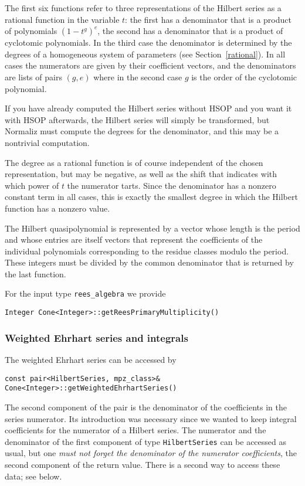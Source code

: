 \begin{small}
The first six functions refer to three representations of the Hilbert series as a rational function in the variable $t$: the first has a denominator that is a product of polynomials $(1-t^g)^e$, the second has a denominator that is a product of cyclotomic polynomials. In the third case the denominator is determined by the degrees of a homogeneous system of parameters (see Section~\ref{rational}). In all cases the numerators are given by their coefficient vectors, and the denominators are lists of pairs $(g,e)$ where in the second case $g$ is the order of the cyclotomic polynomial.

If you have already computed the Hilbert series without HSOP and you want it with HSOP afterwards, the Hilbert series will simply be transformed, but Normaliz must compute the degrees for the denominator, and this may be a nontrivial computation.

The degree as a rational function is of course independent of the chosen representation, but may be negative, as well as the shift that indicates with which power of $t$ the numerator tarts. Since the denominator has a nonzero constant term in all cases, this is exactly the smallest degree in which the Hilbert function has a nonzero value.

The Hilbert quasipolynomial is represented by a vector whose length is the period and whose entries are itself vectors that represent the coefficients of the individual polynomials corresponding to the residue classes modulo the period. These integers must be divided by the common denominator that is returned by the last function.

For the input type \verb|rees_algebra| we provide
\begin{Verbatim}
Integer Cone<Integer>::getReesPrimaryMultiplicity()
\end{Verbatim}

\subsubsection{Weighted Ehrhart series and integrals}

The weighted Ehrhart series can be accessed by
\begin{Verbatim}
const pair<HilbertSeries, mpz_class>& Cone<Integer>::getWeightedEhrhartSeries()
\end{Verbatim}
The second component of the pair is the denominator of the coefficients in the series numerator. Its introduction was necessary since we wanted to keep integral coefficients for the numerator of a Hilbert series. The numerator and the denominator of the first component of type \verb|HilbertSeries| can be accessed as usual, but one \emph{must not forget the denominator of the numerator coefficients}, the second component of the return value. There is a second way to access these data; see below.


\end{small}
